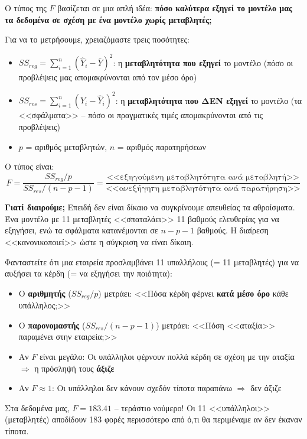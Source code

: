 \documentclass[12pt,a4paper]{article}
\begin{document}
\begin{theorybox}
Ο τύπος της $F$ βασίζεται σε μια απλή ιδέα: \textbf{πόσο καλύτερα εξηγεί το μοντέλο μας τα δεδομένα σε σχέση με ένα μοντέλο χωρίς μεταβλητές;}

Για να το μετρήσουμε, χρειαζόμαστε τρεις ποσότητες:
\begin{itemize}
    \item $SS_{reg} = \sum_{i=1}^{n}(\hat{Y}_i - \bar{Y})^2$: η \textbf{μεταβλητότητα που εξηγεί} το μοντέλο (πόσο οι προβλέψεις μας απομακρύνονται από τον μέσο όρο)
    \item $SS_{res} = \sum_{i=1}^{n}(Y_i - \hat{Y}_i)^2$: η \textbf{μεταβλητότητα που ΔΕΝ εξηγεί} το μοντέλο (τα <<σφάλματα>> -- πόσο οι πραγματικές τιμές απομακρύνονται από τις προβλέψεις)
    \item $p$ = αριθμός μεταβλητών, $n$ = αριθμός παρατηρήσεων
\end{itemize}

Ο τύπος είναι:
\begin{equation}
F = \frac{SS_{reg} / p}{SS_{res} / (n - p - 1)} = \frac{\text{<<εξηγούμενη μεταβλητότητα ανά μεταβλητή>>}}{\text{<<ανεξήγητη μεταβλητότητα ανά παρατήρηση>>}}
\end{equation}

\textbf{Γιατί διαιρούμε;} Επειδή δεν είναι δίκαιο να συγκρίνουμε απευθείας τα αθροίσματα. Ένα μοντέλο με 11 μεταβλητές <<σπαταλάει>> 11 βαθμούς ελευθερίας για να εξηγήσει, ενώ τα σφάλματα κατανέμονται σε $n - p - 1$ βαθμούς. Η διαίρεση <<κανονικοποιεί>> ώστε η σύγκριση να είναι δίκαιη.
\end{theorybox}

\begin{examplebox}
Φανταστείτε ότι μια εταιρεία προσλαμβάνει 11 υπαλλήλους (= 11 μεταβλητές) για να αυξήσει τα κέρδη (= να εξηγήσει την ποιότητα):
\begin{itemize}
    \item Ο \textbf{αριθμητής} ($SS_{reg} / p$) μετράει: <<Πόσα κέρδη φέρνει \textbf{κατά μέσο όρο} κάθε υπάλληλος;>>
    \item Ο \textbf{παρονομαστής} ($SS_{res} / (n-p-1)$) μετράει: <<Πόση <<αταξία>> παραμένει στην εταιρεία;>>
    \item Αν $F$ είναι μεγάλο: Οι υπάλληλοι φέρνουν πολλά κέρδη σε σχέση με την αταξία $\Rightarrow$ η πρόσληψή τους \textbf{άξιζε}
    \item Αν $F \approx 1$: Οι υπάλληλοι δεν κάνουν σχεδόν τίποτα παραπάνω $\Rightarrow$ δεν άξιζε
\end{itemize}

Στα δεδομένα μας, $F = 183.41$ -- τεράστιο νούμερο! Οι 11 <<υπάλληλοι>> (μεταβλητές) αποδίδουν 183 φορές περισσότερο από ό,τι θα περιμέναμε αν δεν έκαναν τίποτα.
\end{examplebox}
\end{document}
